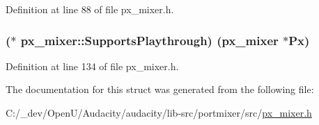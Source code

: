 Definition at line 88 of file px\+\_\+mixer.\+h.

\subsubsection[{\texorpdfstring{Supports\+Playthrough}{SupportsPlaythrough}}]{($\ast$ px\+\_\+mixer\+::\+Supports\+Playthrough) ({\bf px\+\_\+mixer} $\ast$Px)}\hypertarget{structpx__mixer_a9e2fc3cb31ed8cfabbb19599cb400eb1}{}\label{structpx__mixer_a9e2fc3cb31ed8cfabbb19599cb400eb1}


Definition at line 134 of file px\+\_\+mixer.\+h.



The documentation for this struct was generated from the following file\+:\begin{DoxyCompactItemize}
\item 
C\+:/\+\_\+dev/\+Open\+U/\+Audacity/audacity/lib-\/src/portmixer/src/\hyperlink{px__mixer_8h}{px\+\_\+mixer.\+h}\end{DoxyCompactItemize}
